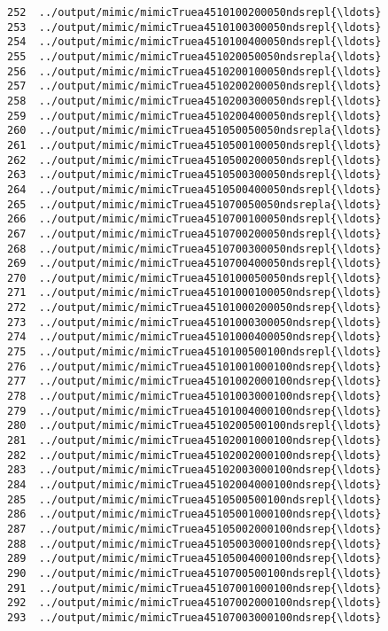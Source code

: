 \documentclass[11pt]{article}
\begin{document}
\begin{Verbatim}[commandchars=\\\{\}]
252  ../output/mimic/mimicTruea4510100200050ndsrepl{\ldots}  
253  ../output/mimic/mimicTruea4510100300050ndsrepl{\ldots}  
254  ../output/mimic/mimicTruea4510100400050ndsrepl{\ldots}  
255  ../output/mimic/mimicTruea451020050050ndsrepla{\ldots}  
256  ../output/mimic/mimicTruea4510200100050ndsrepl{\ldots}  
257  ../output/mimic/mimicTruea4510200200050ndsrepl{\ldots}  
258  ../output/mimic/mimicTruea4510200300050ndsrepl{\ldots}  
259  ../output/mimic/mimicTruea4510200400050ndsrepl{\ldots}  
260  ../output/mimic/mimicTruea451050050050ndsrepla{\ldots}  
261  ../output/mimic/mimicTruea4510500100050ndsrepl{\ldots}  
262  ../output/mimic/mimicTruea4510500200050ndsrepl{\ldots}  
263  ../output/mimic/mimicTruea4510500300050ndsrepl{\ldots}  
264  ../output/mimic/mimicTruea4510500400050ndsrepl{\ldots}  
265  ../output/mimic/mimicTruea451070050050ndsrepla{\ldots}  
266  ../output/mimic/mimicTruea4510700100050ndsrepl{\ldots}  
267  ../output/mimic/mimicTruea4510700200050ndsrepl{\ldots}  
268  ../output/mimic/mimicTruea4510700300050ndsrepl{\ldots}  
269  ../output/mimic/mimicTruea4510700400050ndsrepl{\ldots}  
270  ../output/mimic/mimicTruea4510100050050ndsrepl{\ldots}  
271  ../output/mimic/mimicTruea45101000100050ndsrep{\ldots}  
272  ../output/mimic/mimicTruea45101000200050ndsrep{\ldots}  
273  ../output/mimic/mimicTruea45101000300050ndsrep{\ldots}  
274  ../output/mimic/mimicTruea45101000400050ndsrep{\ldots}  
275  ../output/mimic/mimicTruea4510100500100ndsrepl{\ldots}  
276  ../output/mimic/mimicTruea45101001000100ndsrep{\ldots}  
277  ../output/mimic/mimicTruea45101002000100ndsrep{\ldots}  
278  ../output/mimic/mimicTruea45101003000100ndsrep{\ldots}  
279  ../output/mimic/mimicTruea45101004000100ndsrep{\ldots}  
280  ../output/mimic/mimicTruea4510200500100ndsrepl{\ldots}  
281  ../output/mimic/mimicTruea45102001000100ndsrep{\ldots}  
282  ../output/mimic/mimicTruea45102002000100ndsrep{\ldots}  
283  ../output/mimic/mimicTruea45102003000100ndsrep{\ldots}  
284  ../output/mimic/mimicTruea45102004000100ndsrep{\ldots}  
285  ../output/mimic/mimicTruea4510500500100ndsrepl{\ldots}  
286  ../output/mimic/mimicTruea45105001000100ndsrep{\ldots}  
287  ../output/mimic/mimicTruea45105002000100ndsrep{\ldots}  
288  ../output/mimic/mimicTruea45105003000100ndsrep{\ldots}  
289  ../output/mimic/mimicTruea45105004000100ndsrep{\ldots}  
290  ../output/mimic/mimicTruea4510700500100ndsrepl{\ldots}  
291  ../output/mimic/mimicTruea45107001000100ndsrep{\ldots}  
292  ../output/mimic/mimicTruea45107002000100ndsrep{\ldots}  
293  ../output/mimic/mimicTruea45107003000100ndsrep{\ldots}  

\end{Verbatim}
\end{document}
